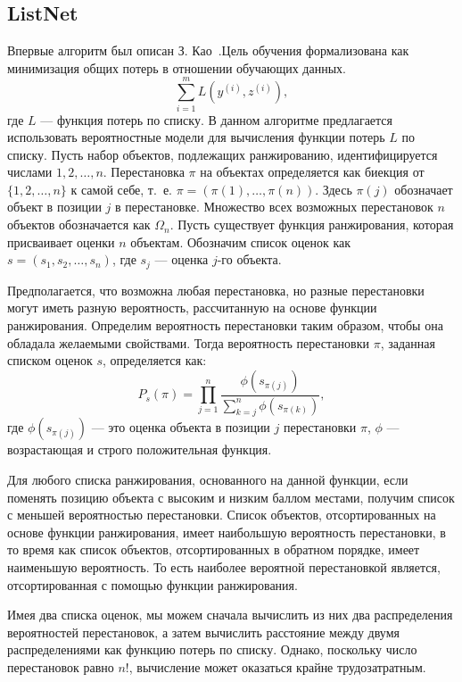 \subsection{ListNet}
Впервые алгоритм был описан З. Као~\cite{ListNet}.Цель обучения формализована как минимизация общих потерь в отношении обучающих данных.
\begin{equation}
	\label{eq:LN1}
	\sum_{i=1}^m L(y^{(i)}, z^{(i)}),
\end{equation}
где $L$ --- функция потерь по списку.
В данном алгоритме предлагается использовать вероятностные модели для вычисления функции потерь $L$ по списку.
Пусть набор объектов, подлежащих ранжированию, идентифицируется числами $1, 2, \dots, n$. Перестановка $\pi$ на объектах определяется как биекция от $\{1, 2, \dots, n\}$ к самой себе, т.~е. $\pi=(\pi(1), \dots, \pi(n))$. Здесь $\pi(j)$ обозначает объект в позиции $j$ в перестановке. Множество всех возможных перестановок $n$ объектов обозначается как $\Omega_n$. Пусть существует функция ранжирования, которая присваивает
оценки $n$ объектам. Обозначим список оценок как $s = (s_1, s_2, \dots, s_n)$, где $s_j$ --- оценка $j$-го объекта. 

Предполагается, что возможна любая перестановка, но разные перестановки могут иметь разную вероятность, рассчитанную на основе функции ранжирования. Определим вероятность перестановки таким образом, чтобы она обладала желаемыми свойствами. Тогда вероятность перестановки $\pi$, заданная списком оценок $s$, определяется как:
\begin{equation}
	\label{eq:LN2}
	P_s(\pi)=\prod_{j=1}^n \frac{\phi(s_{\pi(j)})}{\sum_{k=j}^n \phi(s_{\pi(k)})},
\end{equation}
где $\phi(s_{\pi(j)})$ --- это оценка объекта в позиции $j$ перестановки $\pi$, $\phi$ --- возрастающая и строго положительная функция.

Для любого списка ранжирования, основанного на данной функции, если поменять позицию объекта с высоким и низким баллом местами, получим список с меньшей вероятностью перестановки. Список объектов, отсортированных на основе функции ранжирования, имеет наибольшую вероятность перестановки, в то время как список объектов, отсортированных в обратном порядке, имеет наименьшую вероятность. То есть наиболее вероятной перестановкой является, отсортированная с помощью функции ранжирования.

Имея два списка оценок, мы можем сначала вычислить из них два распределения вероятностей перестановок, а затем вычислить расстояние между двумя распределениями как функцию потерь по списку. Однако, поскольку число перестановок равно $n!$, вычисление может оказаться крайне трудозатратным.

